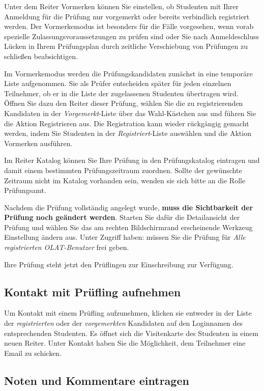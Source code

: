 \documentclass[a4paper,11pt]{article}
\newcommand{\knopf}[1]{{\sc #1}}
\begin{document}
Unter dem Reiter \knopf{Vormerken} können Sie einstellen, ob Studenten mit
Ihrer Anmeldung für die Prüfung nur vorgemerkt oder bereits verbindlich
registriert werden.  Der Vormerkemodus ist besonders für die Fälle vorgesehen,
wenn vorab spezielle Zulassungsvoraussetzungen zu prüfen sind oder Sie nach
Anmeldeschluss Lücken in Ihrem Prüfungsplan durch zeitliche Verschiebung von
Prüfungen zu schließen beabsichtigen.  

Im Vormerkemodus werden die Prüfungskandidaten zunächst in eine temporäre
Liste aufgenommen. Sie als Prüfer entscheiden später für jeden einzelnen
Teilnehmer, ob er in die Liste der zugelassenen Studenten übertragen wird.
Öffnen Sie dazu den Reiter dieser Prüfung, wählen Sie die zu registrierenden
Kandidaten in der {\em Vorgemerkt}-Liste über das Wahl-Kästchen aus und führen
Sie die Aktion \knopf{Registrieren} aus. Die Registration kann wieder
rückgängig gemacht werden, indem Sie Studenten in der {\em Registriert}-Liste
auswählen und die Aktion \knopf{Vormerken} ausführen.

Im Reiter \knopf{Katalog} können Sie Ihre Prüfung in den Prüfungskatalog
eintragen und damit einem bestimmten Prüfungszeitraum zuordnen.  Sollte der
gewünschte Zeitraum nicht im Katalog vorhanden sein, wenden sie sich bitte an
die Rolle Prüfungsamt.

Nachdem die Prüfung vollständig angelegt wurde, {\bf muss die Sichtbarkeit der
  Prüfung noch geändert werden}. Starten Sie dafür die \knopf{Detailansicht}
der Prüfung und wählen Sie das am rechten Bildschirmrand erscheinende Werkzeug
\knopf{Einstellung ändern} aus. Unter \knopf{Zugriff haben:} müssen Sie die
Prüfung für {\em Alle registrierten OLAT-Benutzer} frei geben.  

Ihre Prüfung steht jetzt den Prüflingen zur Einschreibung zur Verfügung.

\subsection{Kontakt mit Prüfling aufnehmen}

Um Kontakt mit einem Prüfling aufzunehmen, klicken sie entweder in der Liste
der {\em registrierten} oder der {\em vorgemerkten} Kandidaten auf den
Loginnamen des entsprechenden Studenten. Es öffnet sich die
\knopf{Visitenkarte} des Studenten in einem neuen Reiter. Unter
\knopf{Kontakt} haben Sie die Möglichkeit, dem Teilnehmer eine Email zu
schicken.

\subsection{Noten und Kommentare eintragen}
\end{document}
